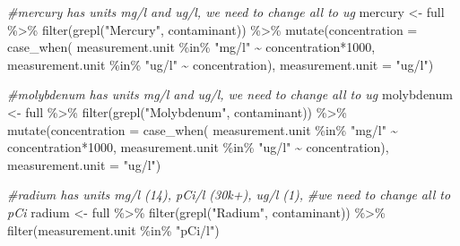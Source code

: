 \documentclass[12pt, twoside]{amherstthesis}
\newenvironment{Shaded}{\begin{snugshade}}{\end{snugshade}}
\newcommand{\AttributeTok}[1]{\textcolor[rgb]{0.77,0.63,0.00}{#1}}
\newcommand{\CommentTok}[1]{\textcolor[rgb]{0.56,0.35,0.01}{\textit{#1}}}
\newcommand{\DecValTok}[1]{\textcolor[rgb]{0.00,0.00,0.81}{#1}}
\newcommand{\FunctionTok}[1]{\textcolor[rgb]{0.00,0.00,0.00}{#1}}
\newcommand{\NormalTok}[1]{#1}
\newcommand{\OtherTok}[1]{\textcolor[rgb]{0.56,0.35,0.01}{#1}}
\newcommand{\SpecialCharTok}[1]{\textcolor[rgb]{0.00,0.00,0.00}{#1}}
\newcommand{\StringTok}[1]{\textcolor[rgb]{0.31,0.60,0.02}{#1}}
\begin{document}
\begin{Shaded}
\begin{Highlighting}[]
\CommentTok{\#mercury has units mg/l and ug/l, we need to change all to ug}
\NormalTok{mercury }\OtherTok{\textless{}{-}}\NormalTok{ full }\SpecialCharTok{\%\textgreater{}\%}
  \FunctionTok{filter}\NormalTok{(}\FunctionTok{grepl}\NormalTok{(}\StringTok{"Mercury"}\NormalTok{, contaminant)) }\SpecialCharTok{\%\textgreater{}\%}
  \FunctionTok{mutate}\NormalTok{(}\AttributeTok{concentration =} 
           \FunctionTok{case\_when}\NormalTok{(}
\NormalTok{             measurement.unit }\SpecialCharTok{\%in\%} \StringTok{"mg/l"} \SpecialCharTok{\textasciitilde{}}\NormalTok{ concentration}\SpecialCharTok{*}\DecValTok{1000}\NormalTok{,}
\NormalTok{             measurement.unit }\SpecialCharTok{\%in\%} \StringTok{"ug/l"} \SpecialCharTok{\textasciitilde{}}\NormalTok{ concentration),}
         \AttributeTok{measurement.unit =} \StringTok{"ug/l"}\NormalTok{)}


\CommentTok{\#molybdenum has units mg/l and ug/l, we need to change all to ug}
\NormalTok{molybdenum }\OtherTok{\textless{}{-}}\NormalTok{ full }\SpecialCharTok{\%\textgreater{}\%}
  \FunctionTok{filter}\NormalTok{(}\FunctionTok{grepl}\NormalTok{(}\StringTok{"Molybdenum"}\NormalTok{, contaminant)) }\SpecialCharTok{\%\textgreater{}\%}
  \FunctionTok{mutate}\NormalTok{(}\AttributeTok{concentration =} 
           \FunctionTok{case\_when}\NormalTok{(}
\NormalTok{             measurement.unit }\SpecialCharTok{\%in\%} \StringTok{"mg/l"} \SpecialCharTok{\textasciitilde{}}\NormalTok{ concentration}\SpecialCharTok{*}\DecValTok{1000}\NormalTok{,}
\NormalTok{             measurement.unit }\SpecialCharTok{\%in\%} \StringTok{"ug/l"} \SpecialCharTok{\textasciitilde{}}\NormalTok{ concentration),}
         \AttributeTok{measurement.unit =} \StringTok{"ug/l"}\NormalTok{)}


\CommentTok{\#radium has units mg/l (14), pCi/l (30k+), ug/l (1), }
\CommentTok{\#we need to change all to pCi}
\NormalTok{radium }\OtherTok{\textless{}{-}}\NormalTok{ full }\SpecialCharTok{\%\textgreater{}\%}
  \FunctionTok{filter}\NormalTok{(}\FunctionTok{grepl}\NormalTok{(}\StringTok{"Radium"}\NormalTok{, contaminant)) }\SpecialCharTok{\%\textgreater{}\%}
  \FunctionTok{filter}\NormalTok{(measurement.unit }\SpecialCharTok{\%in\%} \StringTok{"pCi/l"}\NormalTok{)}


\end{Highlighting}
\end{Shaded}
\end{document}
